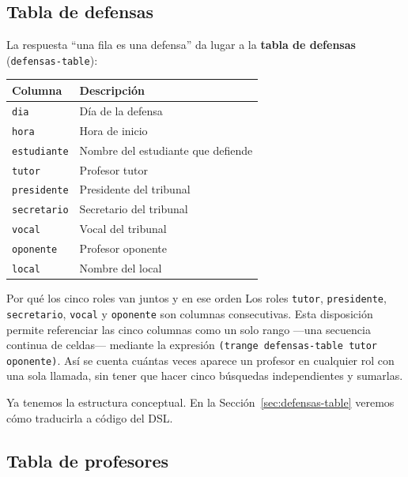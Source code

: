 \documentclass[12pt,a4paper]{report}
\begin{document}
\subsection{Tabla de defensas}

La respuesta ``una fila es una defensa'' da lugar a la \textbf{tabla de
defensas} (\texttt{defensas-table}):

\begin{center}
\begin{tabular}{ll}
\toprule
\textbf{Columna}     & \textbf{Descripción} \\
\midrule
\texttt{dia}         & Día de la defensa \\
\texttt{hora}        & Hora de inicio \\
\texttt{estudiante}  & Nombre del estudiante que defiende \\
\texttt{tutor}       & Profesor tutor \\
\texttt{presidente}  & Presidente del tribunal \\
\texttt{secretario}  & Secretario del tribunal \\
\texttt{vocal}       & Vocal del tribunal \\
\texttt{oponente}    & Profesor oponente \\
\texttt{local}       & Nombre del local \\
\bottomrule
\end{tabular}
\end{center}

\begin{infobox}{Por qué los cinco roles van juntos y en ese orden}
Los roles \texttt{tutor}, \texttt{presidente}, \texttt{secretario},
\texttt{vocal} y \texttt{oponente} son columnas consecutivas.
Esta disposición permite referenciar las cinco columnas como un solo
rango ---una secuencia continua de celdas--- mediante la expresión
\texttt{(trange defensas-table tutor oponente)}.  Así se cuenta
cuántas veces aparece un profesor en cualquier rol con una sola
llamada, sin tener que hacer cinco búsquedas independientes y sumarlas.
\end{infobox}

Ya tenemos la estructura conceptual.  En la
Sección~\ref{sec:defensas-table} veremos cómo traducirla a código del DSL.

\subsection{Tabla de profesores}
\end{document}
